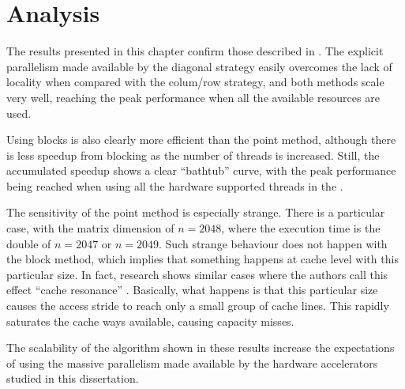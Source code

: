 \documentclass[../thesis]{subfiles}
\begin{document}
	\section{Analysis}
	\label{sec:multicore:analysis}

	The results presented in this chapter confirm those described in \cite{Deadman:Higham:Ralha:2013}. The explicit parallelism made available by the diagonal strategy easily overcomes the lack of locality when compared with the colum/row strategy, and both methods scale very well, reaching the peak performance when all the available resources are used.

	Using blocks is also clearly more efficient than the point method, although there is less speedup from blocking as the number of threads is increased. Still, the accumulated speedup shows a clear ``bathtub'' curve, with the peak performance being reached when using all the hardware supported threads in the \cpu.

	The sensitivity of the point method is especially strange. There is a particular case, with the matrix dimension of $n = 2048$, where the execution time is the double of $n = 2047$ or $n = 2049$. Such strange behaviour does not happen with the block method, which implies that something happens at cache level with this particular size. In fact, research shows similar cases where the authors call this effect ``cache resonance'' \cite{MathWorks:LAPACK,SO:cache_resonance}. Basically, what happens is that this particular size causes the access stride to reach only a small group of cache lines. This rapidly saturates the cache ways available, causing capacity misses.

	The scalability of the algorithm shown in these results increase the expectations of using the massive parallelism made available by the hardware accelerators studied in this dissertation.
\end{document}
